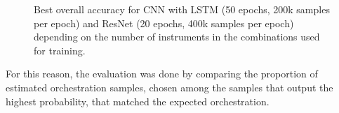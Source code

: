 \documentclass[runningheads,a4paper]{llncs}
\begin{document}
\begin{figure}
  \caption{Best overall accuracy for CNN with LSTM (50 epochs, 200k samples per epoch) and ResNet (20 epochs, 400k samples per epoch) depending on the number of instruments in the combinations used for training. \label{cnn_vs_resnet}}
  \end{figure}
  
%
For this reason, the evaluation was done by comparing the proportion of estimated orchestration samples, chosen among the samples that output the highest probability, that matched the expected orchestration.
\end{document}
